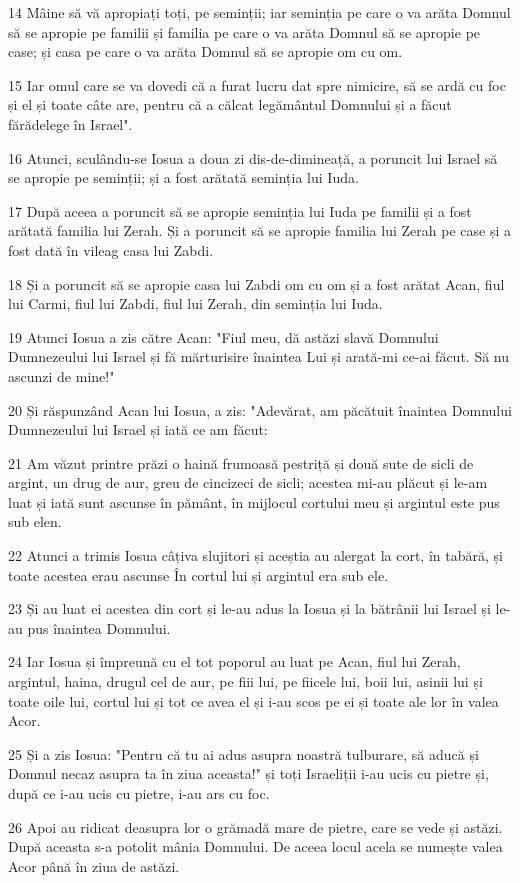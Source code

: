 \par 14 Mâine să vă apropiați toți, pe seminții; iar seminția pe care o va arăta Domnul să se apropie pe familii și familia pe care o va arăta Domnul să se apropie pe case; și casa pe care o va arăta Domnul să se apropie om cu om.
\par 15 Iar omul care se va dovedi că a furat lucru dat spre nimicire, să se ardă cu foc și el și toate câte are, pentru că a călcat legământul Domnului și a făcut fărădelege în Israel".
\par 16 Atunci, sculându-se Iosua a doua zi dis-de-dimineață, a poruncit lui Israel să se apropie pe seminții; și a fost arătată seminția lui Iuda.
\par 17 După aceea a poruncit să se apropie seminția lui Iuda pe familii și a fost arătată familia lui Zerah. Și a poruncit să se apropie familia lui Zerah pe case și a fost dată în vileag casa lui Zabdi.
\par 18 Și a poruncit să se apropie casa lui Zabdi om cu om și a fost arătat Acan, fiul lui Carmi, fiul lui Zabdi, fiul lui Zerah, din seminția lui Iuda.
\par 19 Atunci Iosua a zis către Acan: "Fiul meu, dă astăzi slavă Domnului Dumnezeului lui Israel și fă mărturisire înaintea Lui și arată-mi ce-ai făcut. Să nu ascunzi de mine!"
\par 20 Și răspunzând Acan lui Iosua, a zis: "Adevărat, am păcătuit înaintea Domnului Dumnezeului lui Israel și iată ce am făcut:
\par 21 Am văzut printre prăzi o haină frumoasă pestriță și două sute de sicli de argint, un drug de aur, greu de cincizeci de sicli; acestea mi-au plăcut și le-am luat și iată sunt ascunse în pământ, în mijlocul cortului meu și argintul este pus sub elen.
\par 22 Atunci a trimis Iosua câțiva slujitori și aceștia au alergat la cort, în tabără, și toate acestea erau ascunse În cortul lui și argintul era sub ele.
\par 23 Și au luat ei acestea din cort și le-au adus la Iosua și la bătrânii lui Israel și le-au pus înaintea Domnului.
\par 24 Iar Iosua și împreună cu el tot poporul au luat pe Acan, fiul lui Zerah, argintul, haina, drugul cel de aur, pe fiii lui, pe fiicele lui, boii lui, asinii lui și toate oile lui, cortul lui și tot ce avea el și i-au scos pe ei și toate ale lor în valea Acor.
\par 25 Și a zis Iosua: "Pentru că tu ai adus asupra noastră tulburare, să aducă și Domnul necaz asupra ta în ziua aceasta!" și toți Israeliții i-au ucis cu pietre și, după ce i-au ucis cu pietre, i-au ars cu foc.
\par 26 Apoi au ridicat deasupra lor o grămadă mare de pietre, care se vede și astăzi. După aceasta s-a potolit mânia Domnului. De aceea locul acela se numește valea Acor până în ziua de astăzi.

